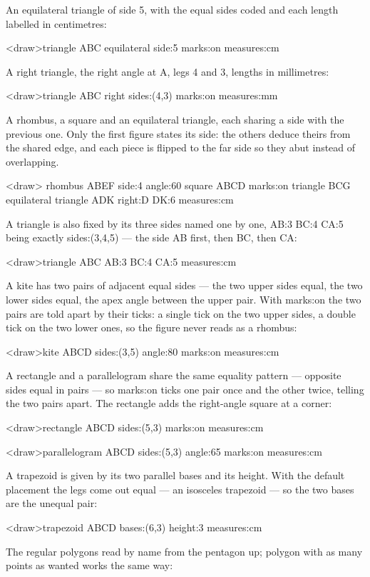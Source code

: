 \documentclass[
  margins=8,
  font=Latin Modern Roman,
  size=12,
  linespread=1.4,
  lang=en
]{scholatex}
\begin{document}
An equilateral triangle of side 5, with the equal sides coded and each
length labelled in centimetres:

<draw>triangle ABC equilateral side:5 marks:on measures:cm

A right triangle, the right angle at A, legs 4 and 3, lengths in millimetres:

<draw>triangle ABC right sides:(4,3) marks:on measures:mm

A rhombus, a square and an equilateral triangle, each sharing a side with
the previous one. Only the first figure states its side: the others deduce
theirs from the shared edge, and each piece is flipped to the far side so
they abut instead of overlapping.

<draw>{
	rhombus ABEF side:4 angle:60
	square ABCD marks:on
	triangle BCG equilateral
	triangle ADK right:D DK:6 measures:cm
}

A triangle is also fixed by its three sides named one by one, AB:3 BC:4
CA:5 being exactly sides:(3,4,5) — the side AB first, then BC, then CA:

<draw>triangle ABC AB:3 BC:4 CA:5 measures:cm

A kite has two pairs of adjacent equal sides — the two upper sides equal,
the two lower sides equal, the apex angle between the upper pair. With
marks:on the two pairs are told apart by their ticks: a single tick on the
two upper sides, a double tick on the two lower ones, so the figure never
reads as a rhombus:

<draw>kite ABCD sides:(3,5) angle:80 marks:on measures:cm

A rectangle and a parallelogram share the same equality pattern — opposite
sides equal in pairs — so marks:on ticks one pair once and the other twice,
telling the two pairs apart. The rectangle adds the right-angle square at a
corner:

<draw>rectangle ABCD sides:(5,3) marks:on measures:cm

<draw>parallelogram ABCD sides:(5,3) angle:65 marks:on measures:cm

A trapezoid is given by its two parallel bases and its height. With the
default placement the legs come out equal — an isosceles trapezoid — so the
two bases are the unequal pair:

<draw>trapezoid ABCD bases:(6,3) height:3 measures:cm

The regular polygons read by name from the pentagon up; polygon with as
many points as wanted works the same way:
\end{document}
